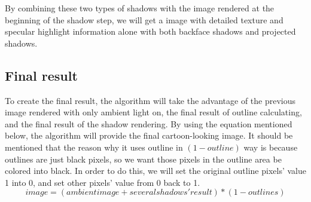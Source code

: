 \documentclass{acmsiggraph}               %
\begin{document}
By combining these two types of shadows with the image rendered at the beginning of the shadow step, we will get a image with detailed texture and specular highlight information alone with both backface shadows and projected shadows.
\subsection{Final result}
\label{sec:final}
To create the final result, the algorithm will take the advantage of the previous image rendered with only ambient light on, the final result of outline calculating, and the final result of the shadow rendering. By using the equation mentioned below, the algorithm will provide the final cartoon-looking image. It should be mentioned that the reason why it uses outline in $(1 - outline)$ way is because outlines are just black pixels, so we want those pixels in the outline area be colored into black. In order to do this, we will set the original outline pixels' value 1 into 0, and set other pixels' value from 0 back to 1.
\begin{equation}
image = (ambient image + several shadows' result) * (1 - outlines)
\end{equation}
\end{document}
